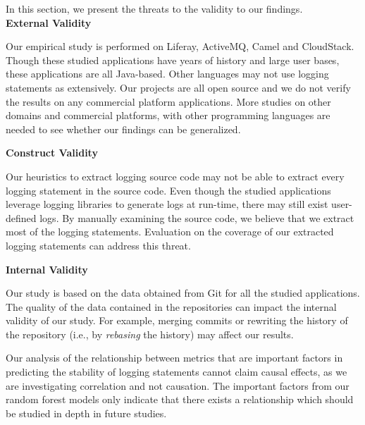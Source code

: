 In this section, we present the threats to the validity to our findings. \\


\noindent \textbf{External Validity}

Our empirical study is performed on Liferay, ActiveMQ, Camel and CloudStack. Though these studied applications have years of history and large user bases, these applications are all Java-based. Other languages may not use logging statements as extensively. Our projects are all open source and we do not verify the results on any commercial platform applications. More studies on other domains and commercial platforms, with other programming languages are needed to see whether our findings can be generalized. 



\noindent \textbf{Construct Validity}


Our heuristics to extract logging source code may not be able to extract every logging statement in the source code. Even though the studied applications leverage logging libraries to generate logs at run-time, there may still exist user-defined logs. By manually examining the source code, we believe that we extract most of the logging statements. Evaluation on the coverage of our extracted logging statements can address this threat.





\noindent \textbf{Internal Validity}

Our study is based on the data obtained from Git for all the studied applications. The quality of the data contained in the repositories can impact the internal validity of our study. For example, merging commits or rewriting the history of the repository (i.e., by \emph{rebasing} the history) may affect our results.  

Our analysis of the relationship between metrics that are important factors in predicting the stability of logging statements cannot claim causal effects, as we are investigating correlation and not causation. The important factors from our random forest models only indicate that there exists a relationship which should be studied in depth in future studies. 



